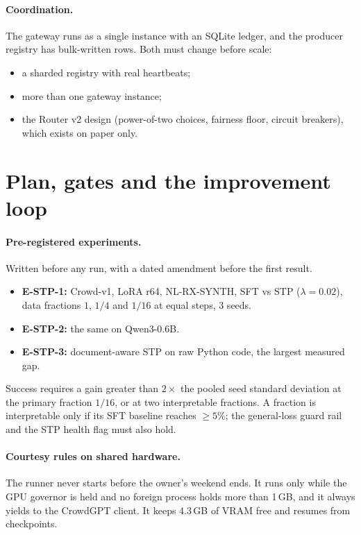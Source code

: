 \documentclass[11pt]{article}
\begin{document}
\paragraph{Coordination.} The gateway runs as a single instance with an SQLite ledger, and the producer registry has
bulk-written rows. Both must change before scale:
\begin{itemize}
\item a sharded registry with real heartbeats;
\item more than one gateway instance;
\item the Router v2 design (power-of-two choices, fairness floor, circuit breakers), which exists on paper only.
\end{itemize}

\section{Plan, gates and the improvement loop}
\paragraph{Pre-registered experiments.} Written before any run, with a dated amendment before the first result.
\begin{itemize}
\item \textbf{E-STP-1:} Crowd-v1, LoRA r64, NL-RX-SYNTH, SFT vs STP ($\lambda=0.02$), data fractions $1$, $1/4$ and
$1/16$ at equal steps, 3 seeds.
\item \textbf{E-STP-2:} the same on Qwen3-0.6B.
\item \textbf{E-STP-3:} document-aware STP on raw Python code, the largest measured gap.
\end{itemize}
Success requires a gain greater than $2\times$ the pooled seed standard deviation at the primary fraction $1/16$, or at
two interpretable fractions. A fraction is interpretable only if its SFT baseline reaches $\ge5\%$; the general-loss
guard rail and the STP health flag must also hold.

\paragraph{Courtesy rules on shared hardware.} The runner never starts before the owner's weekend ends. It runs only
while the GPU governor is held and no foreign process holds more than 1\,GB, and it always yields to the CrowdGPT
client. It keeps 4.3\,GB of VRAM free and resumes from checkpoints.
\end{document}
